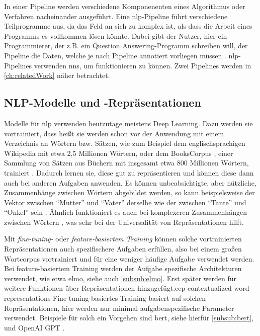 In einer Pipeline werden verschiedene Komponenenten eines Algorithmus oder Verfahren nacheinander ausgeführt.
Eine \ac{nlp}-Pipeline führt verschiedene Teilprogramme aus, da das Feld an sich zu komplex ist, als dass die Arbeit eines Programms es vollkommen lösen könnte.
Dabei gibt der Nutzer, hier ein Programmierer, der z.B. ein Question Answering-Programm schreiben will, der Pipeline die Daten, welche je nach Pipeline annotiert vorliegen müssen \citep{curatorpipeline}.
\ac{nlp}-Pipelines verwenden \acp{nn}, um funktionieren zu können.
Zwei Pipelines werden in \cref{ch:relatedWork} näher betrachtet.

\subsection{NLP-Modelle und -Repräsentationen}

Modelle für \acl{nlp} verwenden heutzutage meistens Deep Learning.
Dazu werden sie vortrainiert, dass heißt sie werden schon vor der Anwendung mit einem Verzeichnis an Wörtern bzw. Sätzen,
wie zum Beispiel dem englischsprachigen Wikipedia mit etwa 2,5 Millionen Wörtern,
oder dem BooksCorpus \citep{bookscorpus},
einer Sammlung von Sätzen aus Büchern mit insgesamt etwa 800 Millionen Wörtern,
trainiert \citep{bert}.
Dadurch lernen sie, diese gut zu repräsentieren und können diese dann auch bei anderen Aufgaben anwenden.
Es können unbeabsichtigte, aber nützliche, Zusammenhänge zwischen Wörtern abgebildet werden,
so kann beispielsweise der Vektor zwischen \enquote{Mutter} und \enquote{Vater} derselbe wie der zwischen \enquote{Tante} und \enquote{Onkel} sein \citep{mikolov2013a}.
Ähnlich funktioniert es auch bei komplexeren Zusammenhängen zwischen Wörtern \citep{mikolov2013b}, was sehr bei der Universalität von Repräsentationen hilft.

Mit \emph{fine-tuning-} oder \emph{feature-basiertem Training} können solche vortrainierten Repräsentationen auch spezifischere Aufgaben erfüllen,
also bei einem großen Wortcorpus vortrainiert und für eine weniger häufige Aufgabe verwendet werden.
Bei feature-basiertem Training werden der Aufgabe spezifische Architekturen verwendet, wie etwa \acs{elmo}, siehe auch \cref{subsub:elmo}.
Erst später werden für weitere Funktionen über Repräsentationen hinzugefügt.eep contextualized word representations
Fine-tuning-basiertes Training basiert auf solchen Repräsentationen, hier werden nur minimal aufgabenspezifische Parameter verwendet.
Beispiele für solch ein Vorgehen sind \acs{bert}, siehe hierfür \cref{subsub:bert}, und OpenAI GPT \citep{openaigpt}.

